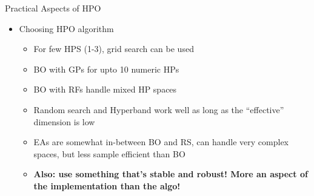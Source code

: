 \begin{vbframe}{Practical Aspects of HPO}
\begin{itemize}
    \item Choosing HPO algorithm
    \begin{itemize}
        \item For few HPS (1-3), grid search can be used
        \item BO with GPs for upto 10 numeric HPs 
        \item BO with RFs handle mixed HP spaces
        \item Random search and Hyperband work well as long as the ``effective'' dimension is low
        \item EAs are somewhat in-between BO and RS, can handle very complex spaces, but less sample efficient than BO
        \item \textbf{Also: use something that's stable and robust! 
          More an aspect of the implementation than the algo!}
    \end{itemize}
\end{itemize}

\end{vbframe}



